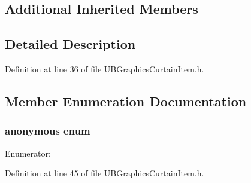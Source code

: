 \subsection*{Additional Inherited Members}


\subsection{Detailed Description}


Definition at line 36 of file U\-B\-Graphics\-Curtain\-Item.\-h.



\subsection{Member Enumeration Documentation}
\hypertarget{class_u_b_graphics_curtain_item_a00db4517e5f1c171ceea483a39719223}{\subsubsection[{anonymous enum}]{\setlength{\rightskip}{0pt plus 5cm}anonymous enum}}\label{d5/d13/class_u_b_graphics_curtain_item_a00db4517e5f1c171ceea483a39719223}
\begin{Desc}
\item[Enumerator\-: ]\par
\begin{description}
\item[{\em 
\hypertarget{class_u_b_graphics_curtain_item_a00db4517e5f1c171ceea483a39719223a06dafce4af45da8ae1847703ee523039}{Type}\label{d5/d13/class_u_b_graphics_curtain_item_a00db4517e5f1c171ceea483a39719223a06dafce4af45da8ae1847703ee523039}
}]\end{description}
\end{Desc}



Definition at line 45 of file U\-B\-Graphics\-Curtain\-Item.\-h.



